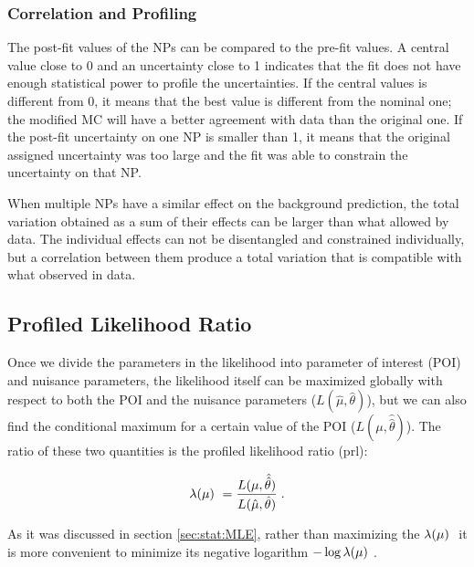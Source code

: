 \subsubsection*{Correlation and Profiling}

The post-fit values of the NPs can be compared to the pre-fit values. A central value close to 0 and an uncertainty close to 1 indicates that the fit does not have enough statistical power to profile the uncertainties. If the central values is different from 0, it means that the best value is different from the nominal one; the modified MC will have a better agreement with data than the original one. If the post-fit uncertainty on one NP is smaller than 1, it means that the original assigned uncertainty was too large and the fit was able to constrain the uncertainty on that NP.

When multiple NPs have a similar effect on the background prediction, the total variation obtained as a sum of their effects can be larger than what allowed by data. The individual effects can not be disentangled and constrained individually, but a correlation between them produce a total variation that is compatible with what observed in data. %


\subsection{Profiled Likelihood Ratio}

Once we divide the parameters in the likelihood into parameter of interest (POI) and nuisance parameters, the likelihood itself can be maximized globally with respect to both the POI and the nuisance parameters ($L(\hat{\mu}, \hat{\theta})$), but we can also find the conditional maximum for a certain value of the POI ($L(\mu, \hat{\hat{\theta}})$). The ratio of these two quantities is the profiled likelihood ratio (prl):

\begin{equation}
\label{eq:stat:prl}
\lambda(\mu) \  = \frac{ L(\mu, \hat{\hat{\theta}}) } {L(\hat{\mu}, \hat{\theta}) } \;.
\end{equation}

As it was discussed in section \ref{sec:stat:MLE}, rather than maximizing the $\lambda(\mu) \ $ it is more convenient to minimize its negative logarithm $- \log{\lambda(\mu)} \ $.


